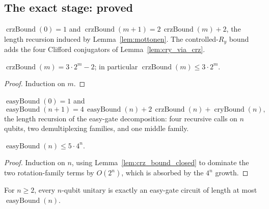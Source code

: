 \subsection{The exact stage: proved}

\begin{definition}
  \label{def:crz_bound}
  \leanok
  $\operatorname{crzBound}(0) = 1$ and
  $\operatorname{crzBound}(m{+}1) = 2\,\operatorname{crzBound}(m) + 2$, the
  length recursion induced by Lemma~\ref{lem:mottonen}.  The controlled-$R_y$
  bound adds the four Clifford conjugators of
  Lemma~\ref{lem:cry_via_crz}.
\end{definition}

\begin{lemma}
  \label{lem:crz_bound_closed}
  \leanok
  $\operatorname{crzBound}(m) = 3\cdot 2^{m} - 2$; in particular
  $\operatorname{crzBound}(m) \le 3\cdot 2^m$.
\end{lemma}

\begin{proof}
  \leanok
  Induction on $m$.
\end{proof}

\begin{definition}
  \label{def:easy_bound}
  \leanok
  $\operatorname{easyBound}(0) = 1$ and
  \[
    \operatorname{easyBound}(n{+}1)
      = 4\,\operatorname{easyBound}(n)
        + 2\,\operatorname{crzBound}(n)
        + \operatorname{cryBound}(n),
  \]
  the length recursion of the easy-gate decomposition: four recursive calls on
  $n$ qubits, two demultiplexing families, and one middle family.
\end{definition}

\begin{lemma}
  \label{lem:easy_bound_4n}
  \leanok
  $\operatorname{easyBound}(n) \le 5\cdot 4^{n}$.
\end{lemma}

\begin{proof}
  \leanok
  Induction on $n$, using Lemma~\ref{lem:crz_bound_closed} to dominate the two
  rotation-family terms by $O(2^n)$, which is absorbed by the $4^n$ growth.
\end{proof}

\begin{lemma}
  \label{lem:lemma1_bounded}
  \leanok
  For $n \ge 2$, every $n$-qubit unitary is exactly an easy-gate circuit of
  length at most $\operatorname{easyBound}(n)$.
\end{lemma}


